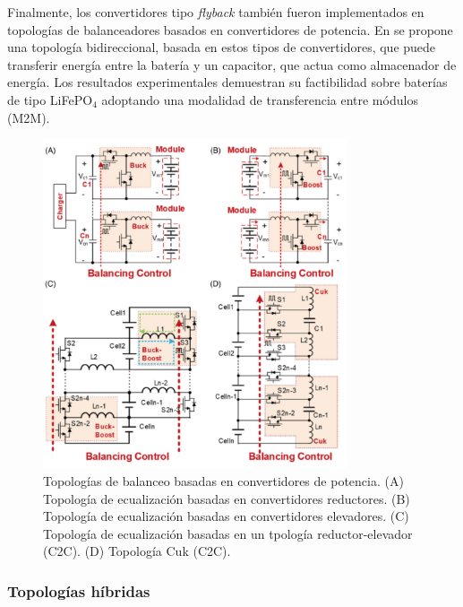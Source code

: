 \documentclass[10pt,a4paper]{article}
\begin{document}
Finalmente, los convertidores tipo \emph{flyback} tambi\'en fueron implementados
en topolog\'ias de balanceadores basados en convertidores de potencia. En
\cite{lin_et_al_bal_bid} se propone una topolog\'ia bidireccional, basada en 
estos tipos de convertidores, que puede transferir energ\'ia entre la bater\'ia y 
un capacitor, que actua como almacenador de energ\'ia. Los resultados 
experimentales demuestran su factibilidad sobre bater\'ias de tipo 
LiFeP$\mathrm{O_4}$ adoptando una modalidad de transferencia entre m\'odulos 
(\acrshort{M2M}).

\begin{figure}[h!]
    \begin{center}
        \includegraphics[width=0.8\textwidth]{pbbc_top.png}
        \caption{Topolog\'ias de balanceo basadas en convertidores de potencia.
                 (A) Topolog\'ia de ecualizaci\'on basadas en convertidores
                 reductores. (B) Topolog\'ia de ecualizaci\'on basadas en
                 convertidores elevadores. (C) Topolog\'ia de ecualizaci\'on
                 basadas en un tpolog\'ia reductor-elevador (\acrshort{C2C}).
                 (D) Topolog\'ia Cuk (\acrshort{C2C}).}
         \label{pbbc_top}
    \end{center}
\end{figure}

\newpage

\subsubsection{Topolog\'ias h\'ibridas}
\end{document}
